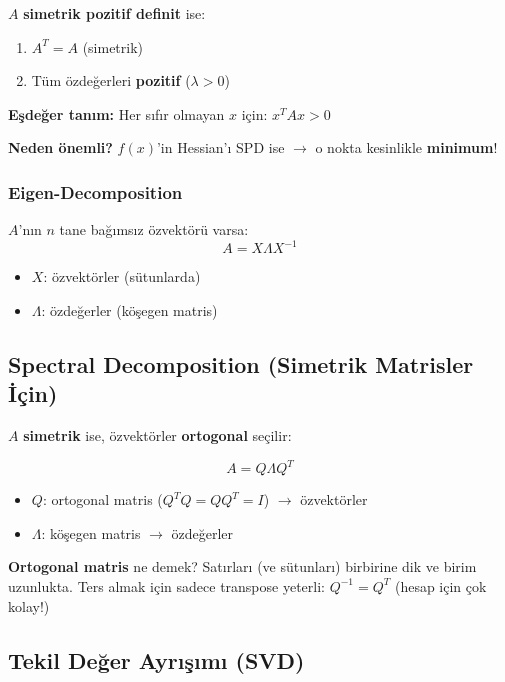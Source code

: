 \documentclass[12pt,a4paper]{article}
\theoremstyle{definition}
\theoremstyle{remark}
\begin{document}
$A$ \textbf{simetrik pozitif definit} ise:
\begin{enumerate}
    \item $A^T = A$ (simetrik)
    \item T\"um \"ozde\u{g}erleri \textbf{pozitif} ($\lambda > 0$)
\end{enumerate}

\textbf{E\c{s}de\u{g}er tan{\i}m:} Her s{\i}f{\i}r olmayan $x$ i\c{c}in: $x^T A x > 0$

\textbf{Neden \"onemli?} $f(x)$'in Hessian'{\i} SPD ise $\to$ o nokta kesinlikle \textbf{minimum}!

\subsubsection{Eigen-Decomposition}

$A$'n{\i}n $n$ tane ba\u{g}{\i}ms{\i}z \"ozvekt\"or\"u varsa:
\[
A = X \Lambda X^{-1}
\]
\begin{itemize}
    \item $X$: \"ozvekt\"orler (s\"utunlarda)
    \item $\Lambda$: \"ozde\u{g}erler (k\"o\c{s}egen matris)
\end{itemize}

\subsection{Spectral Decomposition (Simetrik Matrisler \.{I}\c{c}in)}

$A$ \textbf{simetrik} ise, \"ozvekt\"orler \textbf{ortogonal} se\c{c}ilir:

\[
A = Q \Lambda Q^T
\]

\begin{itemize}
    \item $Q$: ortogonal matris ($Q^T Q = QQ^T = I$) $\to$ \"ozvekt\"orler
    \item $\Lambda$: k\"o\c{s}egen matris $\to$ \"ozde\u{g}erler
\end{itemize}

\textbf{Ortogonal matris} ne demek? Sat{\i}rlar{\i} (ve s\"utunlar{\i}) birbirine dik ve birim uzunlukta.
Ters almak i\c{c}in sadece transpose yeterli: $Q^{-1} = Q^T$ (hesap i\c{c}in \c{c}ok kolay!)

\subsection{Tekil De\u{g}er Ayr{\i}\c{s}{\i}m{\i} (SVD)}
\end{document}
